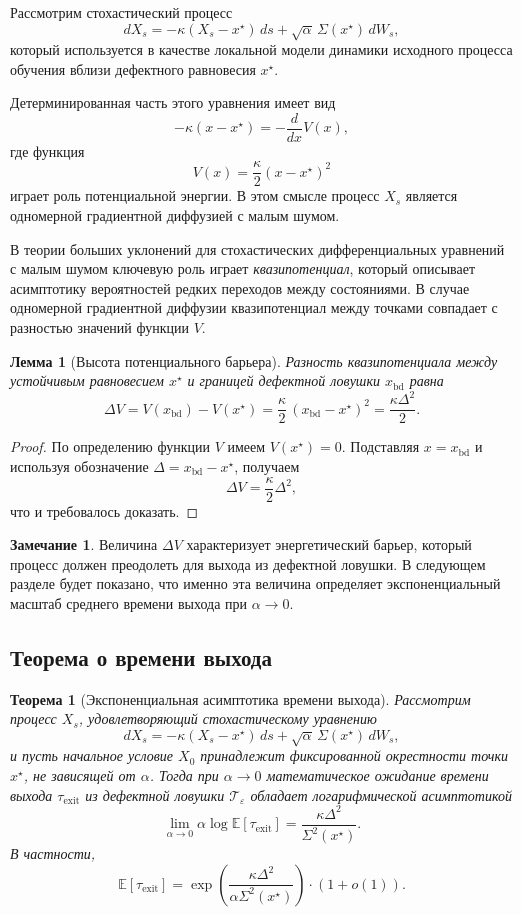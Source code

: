 \documentclass[12pt,a4paper]{article}
\newtheorem{theorem}{Теорема}
\newtheorem{lemma}{Лемма}
\theoremstyle{definition}
\newtheorem{remark}{Замечание}
\begin{document}
Рассмотрим стохастический процесс
\[
dX_s
=
-\kappa (X_s - x^\star)\,ds
+
\sqrt{\alpha}\,\Sigma(x^\star)\,dW_s,
\]
который используется в качестве локальной модели
динамики исходного процесса обучения
вблизи дефектного равновесия $x^\star$.

Детерминированная часть этого уравнения
имеет вид
\[
-\kappa (x - x^\star)
=
- \frac{d}{dx} V(x),
\]
где функция
\[
V(x)
=
\frac{\kappa}{2}(x - x^\star)^2
\]
играет роль потенциальной энергии.
В этом смысле процесс $X_s$
является одномерной градиентной диффузией
с малым шумом.

В теории больших уклонений
для стохастических дифференциальных уравнений
с малым шумом
ключевую роль играет \emph{квазипотенциал},
который описывает асимптотику вероятностей
редких переходов между состояниями.
В случае одномерной градиентной диффузии
квазипотенциал между точками
совпадает с разностью значений функции $V$.

\begin{lemma}[Высота потенциального барьера]
\label{lem:barrier}
Разность квазипотенциала
между устойчивым равновесием $x^\star$
и границей дефектной ловушки $x_{\mathrm{bd}}$
равна
\[
\Delta V
=
V(x_{\mathrm{bd}}) - V(x^\star)
=
\frac{\kappa}{2}\,(x_{\mathrm{bd}} - x^\star)^2
=
\frac{\kappa \Delta^2}{2}.
\]
\end{lemma}

\begin{proof}
По определению функции $V$
имеем $V(x^\star)=0$.
Подставляя $x=x_{\mathrm{bd}}$
и используя обозначение
$\Delta = x_{\mathrm{bd}} - x^\star$,
получаем
\[
\Delta V
=
\frac{\kappa}{2}\Delta^2,
\]
что и требовалось доказать.
\end{proof}

\begin{remark}
Величина $\Delta V$
характеризует энергетический барьер,
который процесс должен преодолеть
для выхода из дефектной ловушки.
В следующем разделе будет показано,
что именно эта величина
определяет экспоненциальный масштаб
среднего времени выхода
при $\alpha \to 0$.
\end{remark}


\subsection{Теорема о времени выхода}

\begin{theorem}[Экспоненциальная асимптотика времени выхода]
\label{thm:exit_time}
Рассмотрим процесс $X_s$,
удовлетворяющий стохастическому уравнению
\[
dX_s
=
-\kappa (X_s - x^\star)\,ds
+
\sqrt{\alpha}\,\Sigma(x^\star)\,dW_s,
\]
и пусть начальное условие $X_0$
принадлежит фиксированной окрестности точки $x^\star$,
не зависящей от $\alpha$.
Тогда при $\alpha \to 0$
математическое ожидание времени выхода
$\tau_{\mathrm{exit}}$
из дефектной ловушки $\mathcal T_\varepsilon$
обладает логарифмической асимптотикой
\[
\lim_{\alpha\to0}
\alpha \log \mathbb E[\tau_{\mathrm{exit}}]
=
\frac{\kappa \Delta^2}{\Sigma^2(x^\star)}.
\]
В частности,
\[
\mathbb E[\tau_{\mathrm{exit}}]
=
\exp\!\left(
\frac{\kappa \Delta^2}
{\alpha \Sigma^2(x^\star)}
\right)
\cdot
(1+o(1)).
\]
\end{theorem}
\end{document}
